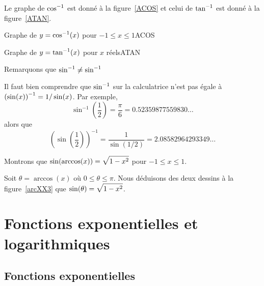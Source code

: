 {Le graphe de $\displaystyle \cos^{-1}$ est donné à la figure~\ref{ACOS} et celui de
$\displaystyle \tan^{-1}$ est donné à la figure~\ref{ATAN}.

{Graphe de $\displaystyle y=\cos^{-1}(x)$ pour $-1 \leq x \leq 1$}{ACOS}

{Graphe de $\displaystyle y=\tan^{-1}(x)$ pour $x$ réels}{ATAN}

\begin{rmk}
Remarquons que $\displaystyle \sin^{-1} \neq \sin^{-1}$

Il faut bien comprendre que $\displaystyle \sin^{-1}$ sur la calculatrice n'est pas
égale à $\displaystyle \left(\sin(x)\right)^{-1} = 1/\sin(x)$.  Par exemple,
\[
\sin^{-1}\left(\frac{1}{2}\right) = \frac{\pi}{6} = 0.52359877559830\ldots
\]
alors que
\[
\left(\sin\left(\frac{1}{2}\right)\right)^{-1}
= \frac{1}{\sin\left(1/2\right)} =
2.08582964293349\ldots
\]
\end{rmk}

\begin{egg}
Montrons que $\displaystyle \sin(\arccos(x)) = \sqrt{1-x^2}$ pour
$-1\leq x \leq 1$. 

Soit $\theta = \arccos(x)$ où $0 \leq \theta \leq \pi$.  Nous
déduisons des deux dessins à la figure~\ref{arcXX3} que
$\displaystyle \sin(\theta) = \sqrt{1-x^2}$.
\end{egg}




\section{Fonctions exponentielles et logarithmiques}

\subsection{Fonctions exponentielles}\label{cerclevicieux}

}

